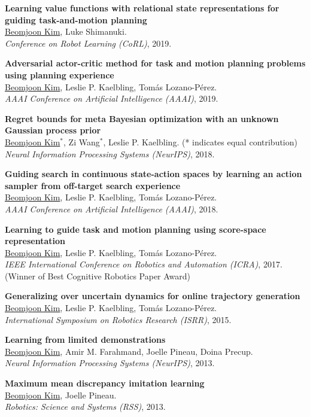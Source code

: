\documentclass[line,margin,letterpaper]{res}
\begin{document}
\begin{resume}
\textbf{Learning value functions with relational state representations for guiding task-and-motion planning}\\
\underline{Beomjoon Kim}, Luke Shimanuki.\\
{\sl Conference on Robot Learning (CoRL)}, 2019.

\textbf{Adversarial actor-critic method for task and motion planning problems using planning experience}\\
\underline{Beomjoon Kim}, Leslie P. Kaelbling, Tom\'as Lozano-P\'erez.\\
{\sl AAAI Conference on Artificial Intelligence (AAAI)}, 2019.

\textbf{Regret bounds for meta Bayesian optimization with an unknown Gaussian process prior}\\
\underline{Beomjoon Kim}$^*$, Zi Wang$^*$,  Leslie P. Kaelbling. {\small(* indicates equal contribution)}\\
{\sl Neural Information Processing Systems (NeurIPS)}, 2018.

\textbf{Guiding search in continuous state-action spaces by learning an action sampler from off-target search experience}\\
\underline{Beomjoon Kim}, Leslie P. Kaelbling, Tom\'as Lozano-P\'erez.\\
{\sl AAAI Conference on Artificial Intelligence (AAAI)}, 2018.

\textbf{Learning to guide task and motion planning using score-space representation}\\
\underline{Beomjoon Kim}, Leslie P. Kaelbling, Tom\'as Lozano-P\'erez.\\
{\sl IEEE International Conference on Robotics and Automation (ICRA)}, 2017.\\
{\small({\color{red}Winner of Best Cognitive Robotics Paper Award})}


\textbf{Generalizing over uncertain dynamics for online trajectory generation}\\
\underline{Beomjoon Kim}, Leslie P. Kaelbling, Tom\'as Lozano-P\'erez.\\
{\sl International Symposium on Robotics Research (ISRR)}, 2015.

\textbf{Learning from limited demonstrations}\\
\underline{Beomjoon Kim}, Amir M. Farahmand, Joelle Pineau, Doina Precup.\\
{\sl Neural Information Processing Systems (NeurIPS)}, 2013.

\textbf{Maximum mean discrepancy imitation learning}\\
\underline{Beomjoon Kim}, Joelle Pineau.\\
{\sl  Robotics: Science and Systems (RSS)}, 2013.


\end{resume}
\end{document}
